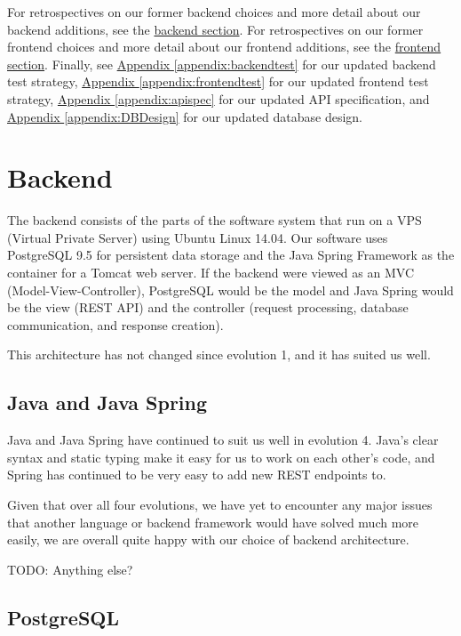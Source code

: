 \documentclass[12pt]{article}
\begin{document}
For retrospectives on our former backend choices and more detail about our backend additions, see the \hyperref[sec:Backend]{backend section}. For retrospectives on our former frontend choices and more detail about our frontend additions, see the \hyperref[sec:Frontend]{frontend section}. Finally, see \hyperref[appendix:backendtest]{Appendix \ref{appendix:backendtest}} for our updated backend test strategy,  \hyperref[appendix:frontendtest]{Appendix \ref{appendix:frontendtest}} for our updated frontend test strategy, \hyperref[appendix:apispec]{Appendix \ref{appendix:apispec}} for our updated API specification, and \hyperref[appendix:DBDesign]{Appendix \ref{appendix:DBDesign}} for our updated database design. 

\section{Backend}

\label{sec:Backend}
The backend consists of the parts of the software system that run on a VPS (Virtual Private Server) using Ubuntu Linux 14.04. Our software uses PostgreSQL 9.5 for persistent data storage and the Java Spring Framework as the container for a Tomcat web server. If the backend were viewed as an MVC (Model-View-Controller), PostgreSQL would be the model and Java Spring would be the view (REST API) and the controller (request processing, database communication, and response creation). 

This architecture has not changed since evolution 1, and it has suited us well. 

\subsection{Java and Java Spring}
Java and Java Spring have continued to suit us well in evolution 4. Java's clear syntax and static typing make it easy for us to work on each other's code, and Spring has continued to be very easy to add new REST endpoints to. 

Given that over all four evolutions, we have yet to encounter any major issues that another language or backend framework would have solved much more easily, we are overall quite happy with our choice of backend architecture. 

TODO: Anything else?



\subsection{PostgreSQL}
\end{document}
